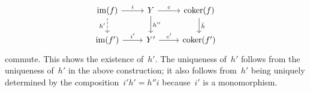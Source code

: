 \begin{remark*}
\begin{enumerate}
      \[
        \begin{tikzcd}
            \im(f)
            \arrow{r}[above]{i}
            \arrow[dashed]{d}[left]{h'}
          & Y
            \arrow{r}[above]{c}
            \arrow{d}[right]{h''}
          & \coker(f)
            \arrow{d}[right]{\bar{h}}
          \\
            \im(f')
            \arrow{r}[above]{i'}
          & Y'
            \arrow{r}[above]{c'}
          & \coker(f')
        \end{tikzcd}
      \]
      commute.
      This shows the existence of~$h'$.
      The uniqueness of~$h'$ follows from the uniqueness of~$h'$ in the above construction;
      it also follows from~$h'$ being uniquely determined by the composition~$i' h' = h'' i$ because~$i'$ is a monomorphism.
      

\end{enumerate}
\end{remark*}
